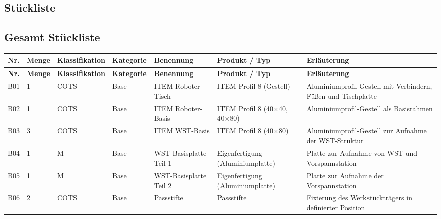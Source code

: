 \begin{landscape}
\section{Stückliste}
\subsection{Gesamt Stückliste}
{
\small
\setlength{\tabcolsep}{3pt}
\renewcommand{\arraystretch}{1.15}

\begin{longtable}{|l|l|l|l|l|p{4.6cm}|p{6.5cm}|}
\hline
\textbf{Nr.} & \textbf{Menge} & \textbf{Klassifikation} & \textbf{Kategorie} & \textbf{Benennung} & \textbf{Produkt / Typ} & \textbf{Erläuterung} \\
\hline
\endfirsthead

\hline
\textbf{Nr.} & \textbf{Menge} & \textbf{Klassifikation} & \textbf{Kategorie} & \textbf{Benennung} & \textbf{Produkt / Typ} & \textbf{Erläuterung} \\
\hline
\endhead

\endlastfoot

B01 & 1 & COTS & Base & ITEM Roboter-Tisch & ITEM Profil 8 (Gestell) & Aluminiumprofil-Gestell mit Verbindern, Füßen und Tischplatte \\
\hline
B02 & 1 & COTS & Base & ITEM Roboter-Basis & ITEM Profil 8 (40×40, 40×80) & Aluminiumprofil-Gestell als Basisrahmen \\
\hline
B03 & 3 & COTS & Base & ITEM WST-Basis & ITEM Profil 8 (40×80) & Aluminiumprofil-Gestell zur Aufnahme der WST-Struktur \\
\hline
B04 & 1 & M & Base & WST-Basisplatte Teil 1 & Eigenfertigung (Aluminiumplatte) & Platte zur Aufnahme von WST und Vorspannstation \\
\hline
B05 & 1 & M & Base & WST-Basisplatte Teil 2 & Eigenfertigung (Aluminiumplatte) & Platte zur Aufnahme der Vorspannstation \\
\hline
B06 & 2 & COTS & Base & Passstifte & Passstifte & Fixierung des Werkstückträgers in definierter Position \\
\hline


\end{longtable}}
\end{landscape}
